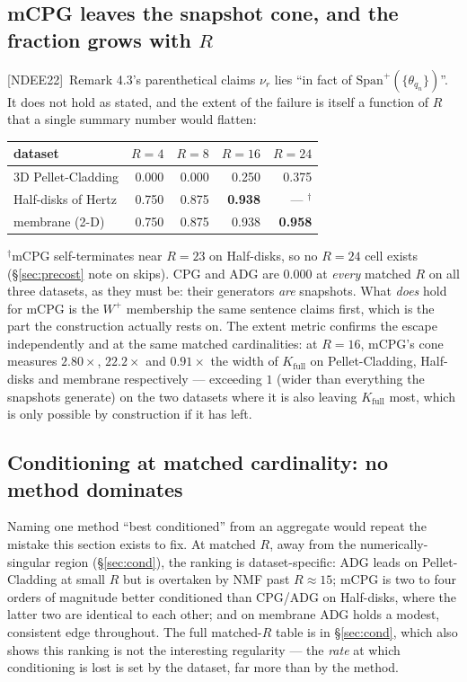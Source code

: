 \documentclass[11pt,a4paper]{article}
\newcommand{\Kfull}{K_{\mathrm{full}}}
\newcommand{\Wp}{W^{+}}
\newcommand{\ndee}{\textsf{[NDEE22]}}
\begin{document}
\subsection{mCPG leaves the snapshot cone, and the fraction grows with $R$}
\ndee{}~Remark 4.3's parenthetical claims $\nu_r$ lies ``in fact of
$\mathrm{Span}^+(\{\theta_{q_n}\})$''. It does not hold as stated, and the extent of the
failure is itself a function of $R$ that a single summary number would flatten:

\begin{center}
\begin{tabular}{@{}lrrrr@{}}
\toprule
dataset & $R=4$ & $R=8$ & $R=16$ & $R=24$ \\
\midrule
3D Pellet-Cladding  & 0.000 & 0.000 & 0.250 & 0.375 \\
Half-disks of Hertz & 0.750 & 0.875 & \textbf{0.938} & --- $^\dagger$ \\
membrane (2-D)      & 0.750 & 0.875 & 0.938 & \textbf{0.958} \\
\bottomrule
\end{tabular}
\end{center}
\noindent$^\dagger$mCPG self-terminates near $R=23$ on Half-disks, so no $R=24$ cell
exists (\S\ref{sec:precost} note on skips). CPG and ADG are $0.000$ at \emph{every}
matched $R$ on all three datasets, as they must be: their generators \emph{are}
snapshots. What \emph{does} hold for mCPG is the $\Wp$ membership the same sentence
claims first, which is the part the construction actually rests on. The extent metric
confirms the escape independently and at the same matched cardinalities: at $R=16$,
mCPG's cone measures $2.80\times$, $22.2\times$ and $0.91\times$ the width of $\Kfull$ on
Pellet-Cladding, Half-disks and membrane respectively --- exceeding $1$ (wider than
everything the snapshots generate) on the two datasets where it is also leaving $\Kfull$
most, which is only possible by construction if it has left.

\subsection{Conditioning at matched cardinality: no method dominates}
Naming one method ``best conditioned'' from an aggregate would repeat the mistake this
section exists to fix. At matched $R$, away from the numerically-singular region
(\S\ref{sec:cond}), the ranking is dataset-specific: ADG leads on Pellet-Cladding at small
$R$ but is overtaken by NMF past $R\approx15$; mCPG is two to four orders of magnitude
better conditioned than CPG/ADG on Half-disks, where the latter two are identical to each
other; and on membrane ADG holds a modest, consistent edge throughout. The full matched-$R$
table is in \S\ref{sec:cond}, which also shows this ranking is not the interesting
regularity --- the \emph{rate} at which conditioning is lost is set by the dataset, far
more than by the method.
\end{document}
